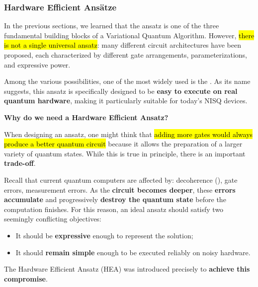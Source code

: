 \subsubsection{Hardware Efficient Ansätze}\label{sec:hardware-efficient-ansatz}

In the previous sections, we learned that the ansatz is one of the three fundamental building blocks of a Variational Quantum Algorithm. However, \hl{there is not a single universal ansatz}: many different circuit architectures have been proposed, each characterized by different gate arrangements, parameterizations, and expressive power.

\highspace
Among the various possibilities, one of the most widely used is the . As its name suggests, this ansatz is specifically designed to be \textbf{easy to execute on real quantum hardware}, making it particularly suitable for today's NISQ devices.

\highspace
\begin{flushleft}
    \textcolor{Green3}{ \textbf{Why do we need a Hardware Efficient Ansatz?}}
\end{flushleft}
When designing an ansatz, one might think that \hl{adding more gates would always produce a better quantum circuit} because it allows the preparation of a larger variety of quantum states. While this is true in principle, there is an important \textbf{trade-off}.

\highspace
\textcolor{Red2}{} Recall that current quantum computers are affected by: decoherence (), gate errors, measurement errors. As the \textbf{circuit becomes deeper}, these \textbf{errors accumulate} and progressively \textbf{destroy the quantum state} before the computation finishes. For this reason, an ideal ansatz should satisfy two seemingly conflicting objectives:
\begin{itemize}
    \item[\textcolor{Green3}{\faIcon{check}}] It should be \textbf{expressive} enough to represent the solution;
    \item[\textcolor{Green3}{\faIcon{check}}] It should \textbf{remain simple} enough to be executed reliably on noisy hardware.
\end{itemize}
The Hardware Efficient Ansatz (HEA) was introduced precisely to \textbf{achieve this compromise}.

